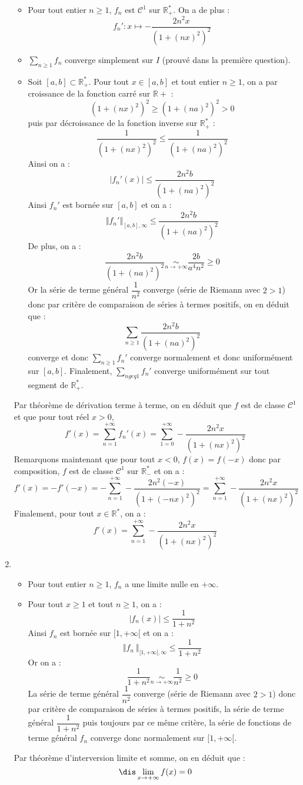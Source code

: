 \documentclass[a4paper,10pt]{report}
\newcommand{\Sum}[2]{\ensuremath{\textstyle{\sum\limits_{#1}^{#2}}}}
\begin{document}
\begin{enumerate}
\begin{itemize}
\item Pour tout entier $n \geq 1$, $f_n$ est $\mathcal{C}^1$ sur $\mathbb{R}_+^{*}$. On a de plus :
$$f_n'  :  x\mapsto -\frac{2n^2x}{(1+(nx)^2)^2}$$
\item $\Sum{n \geq 1}{} f_n$ converge simplement sur $I$ (prouvé dans la première question).
\item Soit $[a,b]\subset \mathbb{R}_+^{*}$. Pour tout $x \in [a,b]$ et tout entier $n \geq 1$, on a par croissance de la fonction carré sur $\mathbb{R}+$ :
$$ (1+(nx)^2)^2 \geq (1+(na)^2)^2 >0$$
puis par décroissance de la fonction inverse sur $\mathbb{R}_+^{*}$ :
$$ \frac{1}{(1+(nx)^2)^2} \leq \frac{1}{(1+(na)^2)^2} $$
Ainsi on a :
$$ \vert f_n'(x) \vert \leq \frac{2n^2 b }{(1+(na)^2)^2}$$
Ainsi $f_n'$ est bornée sur $[a,b]$ et on a :
$$ \Vert f_n' \Vert_{[a,b], \infty} \leq  \frac{2n^2 b }{(1+(na)^2)^2}$$
De plus, on a :
$$ \frac{2n^2 b }{(1+(na)^2)^2} \underset{ n \rightarrow + \infty}{\sim} \frac{2b}{a^4n^2} \geq 0$$
Or la série de terme général $\dfrac{1}{n^2}$ converge (série de Riemann avec $2>1$) donc par critère de comparaison de séries à termes positifs, on en déduit que :
$$ \Sum{n \geq 1}{} \dfrac{2n^2 b }{(1+(na)^2)^2}$$
converge et donc $\Sum{n \geq 1}{} f_n'$ converge normalement et donc uniformément sur $[a,b]$. Finalement, $\Sum{n geq 1}{} f_n'$ converge uniformément sur tout segment de $\mathbb{R}_+^{*}$.
\end{itemize}
Par théorème de dérivation terme à terme, on en déduit que $f$ est de classe $\mathcal{C}^1$ et que pour tout réel $x>0$,
$$f'(x) = \sum_{n=1}^{+\infty} f_n'(x) = \sum_{1=0}^{+\infty}  -\frac{2n^2x}{(1+(nx)^2)^2}$$
Remarquons maintenant que pour tout $x<0$, $f(x)=f(-x)$ donc par composition, $f$ est de classe $\mathcal{C}^1$ sur $\mathbb{R}_{-}^*$ et on a :
$$ f'(x) = -f'(-x) = -  \sum_{n=1}^{+\infty}  -\frac{2n^2(-x)}{(1+(-nx)^2)^2} =  \sum_{n=1}^{+\infty}  -\frac{2n^2x}{(1+(nx)^2)^2}$$
Finalement, pour tout $x \in \mathbb{R}^*$, on a :
$$f'(x)=  \sum_{n=1}^{+\infty}  -\frac{2n^2x}{(1+(nx)^2)^2}$$
\item 

 \begin{itemize}
\item  Pour tout entier $n \geq 1$, $f_n$ a une limite nulle en $+\infty$.
\item Pour tout $x \geq 1$ et tout $n \geq 1$, on a :
$$ \vert f_n(x) \vert \leq \frac{1}{1+n^2}$$
Ainsi $f_n$ est bornée sur $[1, + \infty[$ et on a :
$$ \Vert f_n\ \Vert_{[1,+\infty[, \infty}\leq \frac{1}{1+n^2} $$
Or on a :
$$ \frac{1}{1+n^2} \underset{n \rightarrow + \infty}{\sim} \frac{1}{n^2} \geq 0$$
La série de terme général $\dfrac{1}{n^2}$ converge (série de Riemann avec $2>1$) donc par critère de comparaison de séries à termes positifs, la série de terme général $\dfrac{1}{1+n^2}$ puis toujours par ce même critère, la série de fonctions de terme général $f_n$ converge donc normalement sur $[1, + \infty[$.
\end{itemize}
Par théorème d'interversion limite et somme, on en déduit que :
$$\dis \lim_{x\rightarrow+\infty}f(x)=0$$


\end{enumerate}
\end{document}
